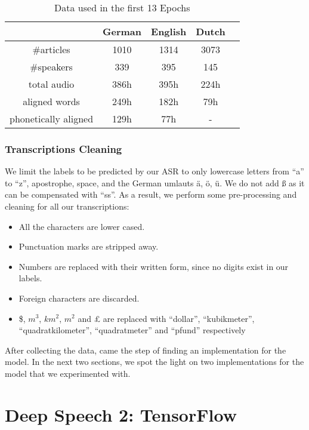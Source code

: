 \begin{table}[!ht]
	\centering
	\begin{tabular}{ | c | c | c | c | c | } 
		\hline
		      &   German &   English    &   Dutch \\ 
		\hline
		\#articles &   1010 &   1314  &   3073    \\
		\hline
		\#speakers &   339 &   395   &   145   \\ 
		\hline
		total audio    &   386h &   395h   &   224h   \\
		\hline
		aligned words   &   249h &   182h  &   79h   \\
		\hline
		phonetically aligned   &   129h &   77h  &   -  \\
		\hline
	\end{tabular}
	\caption{Data used in the first 13 Epochs}
	\label{meth:table0}
\end{table}

\subsubsection{Transcriptions Cleaning}
\label{meth:s2_sub4_subsub7}

We limit the labels to be predicted by our \ac{ASR} to only lowercase letters from \enquote{a} to \enquote{z}, apostrophe, space, and the German umlauts {\"a}, {\"o}, {\"u}. We do not add {\ss} as it can be compensated with \enquote{ss}. As a result, we perform some pre-processing and cleaning for all our transcriptions:
\begin{itemize}
	\item All the characters are lower cased.
	\item Punctuation marks are stripped away.
	\item Numbers are replaced with their written form, since no digits exist in our labels.
	\item Foreign characters are discarded.
	\item \$, $m^3$, $km^2$, $m^2$ and £ are replaced with \enquote{dollar}, \enquote{kubikmeter}, \enquote{quadratkilometer}, \enquote{quadratmeter} and \enquote{pfund} respectively
\end{itemize}

After collecting the data, came the step of finding an implementation for the model. In the next two sections, we spot the light on two implementations for the model that we experimented with.


\section{Deep Speech 2: TensorFlow}
\label{meth:s3}

